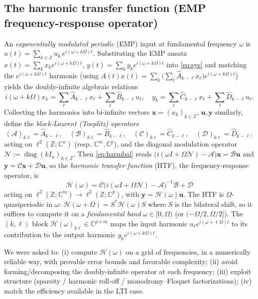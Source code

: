 \documentclass{amsart}
\theoremstyle{definition}
\DeclareMathOperator{\diag}{diag}
\newcommand{\C}{\mathbb{C}}
\newcommand{\Z}{\mathbb{Z}}
\newcommand{\Acal}{\mathcal{A}}
\newcommand{\Bcal}{\mathcal{B}}
\newcommand{\Ccal}{\mathcal{C}}
\newcommand{\Dcal}{\mathcal{D}}
\newcommand{\Hcal}{\mathcal{H}}
\newcommand{\Ncal}{\mathcal{N}}
\begin{document}
\subsection{The harmonic transfer function (EMP frequency-response operator)}
\label{sec:HTF}
An \emph{exponentially modulated periodic} (EMP) input at fundamental frequency
$\omega$ is $u(t)=\sum_{k\in\Z}u_k\,e^{i(\omega+k\Omega)t}$. Substituting the
EMP ansatz $x(t)=\sum_k x_k e^{i(\omega+k\Omega)t}$,
$y(t)=\sum_k y_k e^{i(\omega+k\Omega)t}$ into \eqref{eq:sys} and matching the
$e^{i(\omega+k\Omega)t}$ harmonic (using
$A(t)x(t)=\sum_k\big(\sum_\ell\hat A_{k-\ell}x_\ell\big)e^{i(\omega+k\Omega)t}$)
yields the doubly-infinite algebraic relations
\begin{equation}\label{eq:harmbal}
i(\omega+k\Omega)x_k=\sum_{\ell}\hat A_{k-\ell}x_\ell+\sum_\ell\hat B_{k-\ell}u_\ell,
\quad
y_k=\sum_\ell\hat C_{k-\ell}x_\ell+\sum_\ell\hat D_{k-\ell}u_\ell .
\end{equation}
Collecting the harmonics into bi-infinite vectors
$\mathbf{x}=(x_k)_{k\in\Z}$, $\mathbf u,\mathbf y$ similarly, define the
\emph{block-Laurent (Toeplitz) operators}
\begin{equation}\label{eq:Toep}
(\Acal)_{k\ell}=\hat A_{k-\ell},\quad
(\Bcal)_{k\ell}=\hat B_{k-\ell},\quad
(\Ccal)_{k\ell}=\hat C_{k-\ell},\quad
(\Dcal)_{k\ell}=\hat D_{k-\ell},
\end{equation}
acting on $\ell^2(\Z;\C^n)$ (resp. $\C^m,\C^p$), and the diagonal modulation
operator $\Ncal:=\diag(k I_n)_{k\in\Z}$. Then \eqref{eq:harmbal} reads
$\big(i(\omega I+\Omega\Ncal)-\Acal\big)\mathbf x=\Bcal\mathbf u$ and
$\mathbf y=\Ccal\mathbf x+\Dcal\mathbf u$, so the \emph{harmonic transfer
function} (HTF), the frequency-response operator, is
\begin{equation}\label{eq:HTFdef}
\boxed{\;\Hcal(\omega)=\Ccal\big(i(\omega I+\Omega\Ncal)-\Acal\big)^{-1}\Bcal+\Dcal\;}
\end{equation}
acting on $\ell^2(\Z;\C^m)\to\ell^2(\Z;\C^p)$, with $\mathbf y=\Hcal(\omega)\mathbf u$.
The HTF is $\Omega$-quasiperiodic in $\omega$:
$\Hcal(\omega+\Omega)=S^*\Hcal(\omega)S$ where $S$ is the bilateral shift, so it
suffices to compute it on a \emph{fundamental band} $\omega\in[0,\Omega)$ (or
$(-\Omega/2,\Omega/2]$). The $(k,\ell)$ block $\Hcal(\omega)_{k\ell}\in\C^{p\times m}$
maps the input harmonic $u_\ell e^{i(\omega+\ell\Omega)t}$ to its contribution
to the output harmonic $y_k e^{i(\omega+k\Omega)t}$.

\medskip
We were asked to: (i) compute $\Hcal(\omega)$ on a grid of frequencies, in a
numerically reliable way, with provable error bounds and favorable complexity;
(ii) avoid forming/decomposing the doubly-infinite operator at each frequency;
(iii) exploit structure (sparsity / harmonic roll-off / monodromy–Floquet
factorizations); (iv) match the efficiency available in the LTI case.
\end{document}
